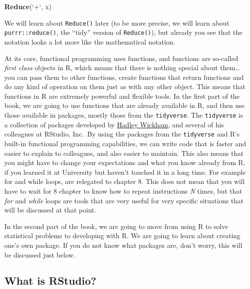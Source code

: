 \documentclass[]{gitbook}
\newenvironment{Shaded}{\begin{snugshade}}{\end{snugshade}}
\newcommand{\DataTypeTok}[1]{\textcolor[rgb]{0.13,0.29,0.53}{#1}}
\newcommand{\KeywordTok}[1]{\textcolor[rgb]{0.13,0.29,0.53}{\textbf{#1}}}
\newcommand{\NormalTok}[1]{#1}
\newcommand{\StringTok}[1]{\textcolor[rgb]{0.31,0.60,0.02}{#1}}
\begin{document}
\begin{Shaded}
\begin{Highlighting}[]
\KeywordTok{Reduce}\NormalTok{(}\StringTok{`}\DataTypeTok{+}\StringTok{`}\NormalTok{, x)}
\end{Highlighting}
\end{Shaded}

We will learn about \texttt{Reduce()} later (to be more precise, we will learn about \texttt{purrr::reduce()},
the ``tidy'' version of \texttt{Reduce()}), but already you see that the notation looks a lot more
like the mathematical notation.

At its core, functional programming uses functions, and functions are so-called \emph{first
class} objects in R, which means that there is nothing special about them\ldots{} you can pass them to
other functions, create functions that return functions and do any kind of operation on them just as
with any other object. This means that functions in R are extremely powerful and flexible tools.
In the first part of the book, we are going to use functions that are already available in R, and
then use those available in packages, mostly those from the \texttt{tidyverse}. The \texttt{tidyverse} is a
collection of packages developed by \href{http://hadley.nz/}{Hadley Wickham}, and several of his colleagues
at RStudio, Inc.~By using the packages from the \texttt{tidyverse} and R's built-in functional programming
capabilities, we can write code that is faster and easier to explain to colleagues, and also easier
to maintain. This also means that you might have to change your expectations and what you know
already from R, if you learned it at University but haven't touched it in a long time. For example
for and while loops, are relegated to chapter 8. This does not mean that you will have to wait for
8 chapter to know how to repeat instructions \emph{N} times, but that \emph{for} and \emph{while} loops are tools that
are very useful for very specific situations that will be discussed at that point.

In the second part of the book, we are going to move from using R to solve statistical problems to
developing with R. We are going to learn about creating one's own package. If you do not know what
packages are, don't worry, this will be discussed just below.

\hypertarget{what-is-rstudio}{%
\subsection*{What is RStudio?}\label{what-is-rstudio}}
\end{document}
